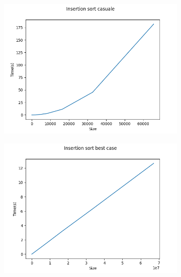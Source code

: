 \documentclass[]{article}
\begin{document}
\begin{figure}[H]
    \centering
    \begin{subfigure}[b]{0.4\linewidth} 
        \centering
        \includegraphics[width=\textwidth]{InsertionSortCasuale}
        \label{fig:insertion_casuale}
    \end{subfigure}
    \quad
    \begin{subfigure}[b]{0.4\linewidth}
        \centering
        \includegraphics[width=\textwidth]{InsertionSortBestCase}
        \label{fig:insertion_best}
    \end{subfigure}
    \\
    \begin{subfigure}[b]{0.4\linewidth}
        \centering

\end{subfigure}
\end{figure}
\end{document}

